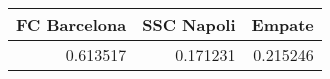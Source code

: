 \begin{tabular}{rrr}
\hline
   FC Barcelona &   SSC Napoli &   Empate \\
\hline
       0.613517 &     0.171231 & 0.215246 \\
\hline
\end{tabular}